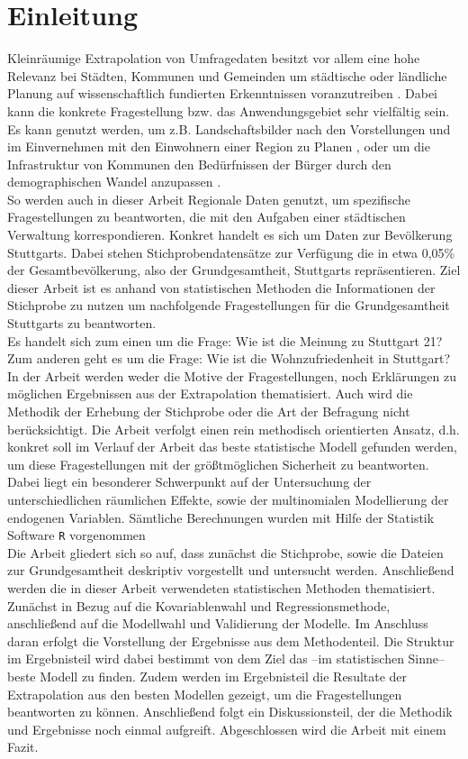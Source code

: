 \documentclass{Vorlage}
\begin{document}
\section{Einleitung}
Kleinräumige Extrapolation von Umfragedaten besitzt vor allem eine hohe Relevanz bei Städten, Kommunen und Gemeinden um städtische oder ländliche Planung auf wissenschaftlich fundierten Erkenntnissen voranzutreiben \cite{Planung}. Dabei kann die konkrete Fragestellung bzw. das Anwendungsgebiet sehr vielfältig sein. Es kann genutzt werden, um z.B. Landschaftsbilder nach den Vorstellungen und im Einvernehmen mit den Einwohnern einer Region zu Planen \cite{Natur}, oder um die Infrastruktur von Kommunen den Bedürfnissen der Bürger durch den demographischen Wandel anzupassen \cite{Lubeck}.\\
So werden auch in dieser Arbeit Regionale Daten genutzt, um spezifische Fragestellungen zu beantworten, die mit den Aufgaben einer städtischen Verwaltung korrespondieren. Konkret handelt es sich um Daten zur Bevölkerung Stuttgarts. Dabei stehen Stichprobendatensätze zur Verfügung die in etwa 0,05\% der Gesamtbevölkerung, also der Grundgesamtheit, Stuttgarts repräsentieren. Ziel dieser Arbeit ist es anhand von statistischen Methoden die Informationen der Stichprobe zu nutzen um nachfolgende Fragestellungen für die Grundgesamtheit Stuttgarts zu beantworten.\\
Es handelt sich zum einen um die Frage: Wie ist die Meinung zu Stuttgart 21? Zum anderen geht es um die Frage: Wie ist die Wohnzufriedenheit in Stuttgart?\\
In der Arbeit werden weder die Motive der Fragestellungen, noch Erklärungen zu möglichen Ergebnissen aus der Extrapolation thematisiert. Auch wird die Methodik der Erhebung der Stichprobe oder die Art der Befragung nicht berücksichtigt. Die Arbeit verfolgt einen rein methodisch orientierten Ansatz, d.h. konkret soll im Verlauf der Arbeit das beste statistische Modell gefunden werden, um diese Fragestellungen mit der größtmöglichen Sicherheit zu beantworten. Dabei liegt ein besonderer Schwerpunkt auf der Untersuchung der unterschiedlichen räumlichen Effekte, sowie der multinomialen Modellierung der endogenen Variablen. Sämtliche Berechnungen wurden mit Hilfe der Statistik Software \texttt{R} vorgenommen \cite{RCore} \\
Die Arbeit gliedert sich so auf, dass zunächst die Stichprobe, sowie die Dateien zur Grundgesamtheit deskriptiv vorgestellt und untersucht werden. Anschließend werden die in dieser Arbeit verwendeten statistischen Methoden thematisiert. Zunächst in Bezug auf die Kovariablenwahl und Regressionsmethode, anschließend auf die Modellwahl und Validierung der Modelle. Im Anschluss daran erfolgt die Vorstellung der Ergebnisse aus dem Methodenteil. Die Struktur im Ergebnisteil wird dabei bestimmt von dem Ziel das --im statistischen Sinne-- beste Modell zu finden. Zudem werden im Ergebnisteil die Resultate der Extrapolation aus den besten Modellen gezeigt, um die Fragestellungen beantworten zu können. Anschließend folgt ein Diskussionsteil, der die Methodik und Ergebnisse noch einmal aufgreift. Abgeschlossen wird die Arbeit mit einem Fazit.
\end{document}
